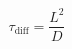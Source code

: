 \documentclass[preview]{standalone}
\begin{document}
\[\tau_\text{diff} = \frac{L^2}{D} \tag{2.6}\]
\end{document}
